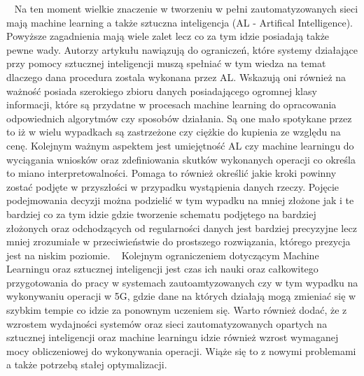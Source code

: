 \documentclass[sn-mathphys,Numbered]{sn-jnl}
\theoremstyle{thmstyleone}%
\theoremstyle{thmstyletwo}%
\theoremstyle{thmstylethree}%
\begin{document}
~   Na ten moment wielkie znaczenie w tworzeniu w pełni zautomatyzowanych sieci mają machine learning a także sztuczna inteligencja (AL - Artifical Intelligence). Powyższe zagadnienia mają wiele zalet lecz co za tym idzie posiadają także pewne wady. Autorzy artykułu nawiązują do ograniczeń, które systemy działające przy pomocy sztucznej inteligencji muszą spełniać w tym wiedza na temat dlaczego dana procedura zostala wykonana przez AL\cite{benzaid_ai-driven_2020-1}. Wskazują oni również na ważność posiada szerokiego zbioru danych posiadającego ogromnej klasy informacji, które są przydatne w procesach machine learning do opracowania odpowiednich algorytmów czy sposobów działania\cite{benzaid_ai-driven_2020-1}. Są one mało spotykane przez to iż w wielu wypadkach są zastrzeżone czy ciężkie do kupienia ze względu na cenę. Kolejnym ważnym aspektem jest umiejętność AL czy machine learningu do wyciągania wniosków oraz zdefiniowania skutków wykonanych operacji co określa to miano interpretowalności. Pomaga to również określić jakie kroki powinny zostać podjęte w przyszłości w przypadku wystąpienia danych rzeczy. Pojęcie podejmowania decyzji można podzielić w tym wypadku na mniej złożone jak i te bardziej co za tym idzie gdzie tworzenie schematu podjętego na bardziej złożonych oraz odchodzących od regularności danych jest bardziej precyzyjne lecz mniej zrozumiałe w przeciwieństwie do prostszego rozwiązania, którego prezycja jest na niskim poziomie\cite{benzaid_ai-driven_2020-1}.
~   Kolejnym ograniczeniem dotyczącym Machine Learningu oraz sztucznej inteligencji jest czas ich nauki oraz całkowitego przygotowania do pracy w systemach zautoamtyzowanych czy w tym wypadku na wykonywaniu operacji w 5G, gdzie dane na których działają mogą zmieniać się w szybkim tempie co idzie za ponownym uczeniem się. Warto również dodać, że z wzrostem wydajności systemów oraz sieci zautomatyzowanych opartych na sztucznej inteligencji oraz machine learningu idzie również wzrost wymaganej mocy obliczeniowej do wykonywania operacji. Wiąże się to z nowymi problemami a także potrzebą stałej optymalizacji\cite{benzaid_ai-driven_2020-1}.
\end{document}
